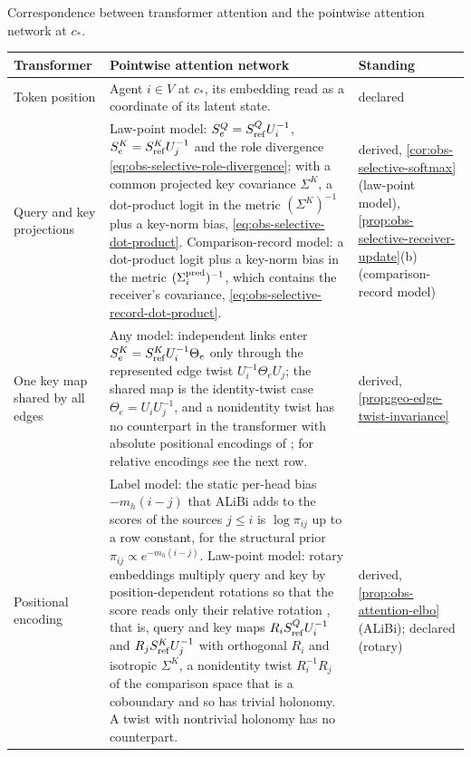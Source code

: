 \begin{sciencetable}{Correspondence between transformer attention and the pointwise attention network at $c_*$.}
\label{tab:obs-transformer-correspondence}
\begin{tabularx}{\textwidth}{>{\raggedright\arraybackslash}p{}>{\raggedright\arraybackslash}X>{\raggedright\arraybackslash}p{}}
\toprule
\textbf{Transformer} & \textbf{Pointwise attention network} & \textbf{Standing} \\
\midrule
Token position & Agent $i\in V$ at $c_*$, its embedding read as a coordinate of its latent state. & declared \\
Query and key projections & Law-point model: $S^Q_e=S^Q_{\rm ref}U_i^{-1}$, $S^K_e=S^K_{\rm ref}U_j^{-1}$ and the role divergence \eqref{eq:obs-selective-role-divergence}; with a common projected key covariance $\Sigma^K$, a dot-product logit in the metric $(\Sigma^K)^{-1}$ plus a key-norm bias, \eqref{eq:obs-selective-dot-product}. Comparison-record model: a dot-product logit plus a key-norm bias in the metric $(\Sigma_i^{\rm pred})^{-1}$, which contains the receiver's covariance, \eqref{eq:obs-selective-record-dot-product}. & derived, \cref{cor:obs-selective-softmax} (law-point model), \cref{prop:obs-selective-receiver-update}(b) (comparison-record model) \\
One key map shared by all edges & Any model: independent links enter $S^K_e=S^K_{\rm ref}U_i^{-1}\Theta_e$ only through the represented edge twist $U_i^{-1}\Theta_eU_j$; the shared map is the identity-twist case $\Theta_e=U_iU_j^{-1}$, and a nonidentity twist has no counterpart in the transformer with absolute positional encodings of \citet{vaswani2017attention}; for relative encodings see the next row. & derived, \cref{prop:geo-edge-twist-invariance} \\
Positional encoding & Label model: the static per-head bias $-m_h(i-j)$ that ALiBi adds to the scores of the sources $j\leq i$ \citep[Section~3]{press2022train} is $\log\pi_{ij}$ up to a row constant, for the structural prior $\pi_{ij}\propto e^{-m_h(i-j)}$. Law-point model: rotary embeddings multiply query and key by position-dependent rotations so that the score reads only their relative rotation \citep[Section~3.2.2, Eq.~(16)]{su2024roformer}, that is, query and key maps $R_iS^Q_{\rm ref}U_i^{-1}$ and $R_jS^K_{\rm ref}U_j^{-1}$ with orthogonal $R_i$ and isotropic $\Sigma^K$, a nonidentity twist $R_i^{-1}R_j$ of the comparison space that is a coboundary and so has trivial holonomy. A twist with nontrivial holonomy has no counterpart. & derived, \cref{prop:obs-attention-elbo} (ALiBi); declared (rotary) \\

\end{tabularx}
\end{sciencetable}
